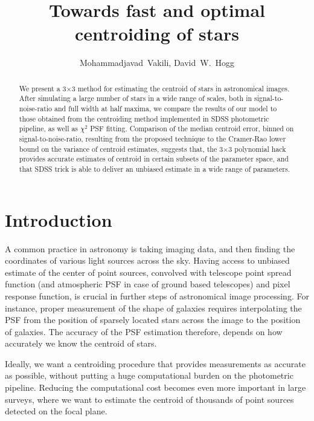 \documentclass[12pt, preprint]{aastex}
\begin{document}
\author{
  Mohammadjavad~Vakili,
  David~W.~Hogg
}

\title{Towards fast and optimal centroiding of stars}

\begin{abstract}

We present a 3$\times$3 method for estimating the centroid of stars in astronomical images. After simulating a large number of stars in a wide range of scales, both in signal-to-noise-ratio and full width at half maxima, we compare the results of our model to those obtained from the centroiding method implemented in
SDSS photometric pipeline, as well as $\chi^{2}$ PSF fitting. Comparison of the median centroid error, binned on signal-to-noise-ratio, resulting from the proposed technique to the Cramer-Rao lower bound on the variance of centroid estimates, suggests that, the 3$\times$3 polynomial hack provides accurate estimates of centroid in certain subsets of the parameter space, and that SDSS trick is able to deliver an unbiased estimate in a wide range of parameters.  

\end{abstract}

\section{Introduction}

A common practice in astronomy is taking imaging data, and then finding the coordinates of various light sources across the sky. Having access to unbiased estimate of the center of point sources, convolved with telescope point spread function (and atmospheric PSF in case of ground based telescopes) and pixel response function, is crucial in further steps of astronomical image processing. For instance, proper measurement of the shape of galaxies requires interpolating the PSF from the position of sparsely located stars across the image to the position of galaxies. The accuracy of the PSF estimation therefore, depends on how accurately we know the centroid of stars.

Ideally, we want a centroiding procedure that provides measurements as accurate as possible, without putting a huge computational burden on the photometric pipeline. Reducing the computational cost becomes even more important in large surveys, where we want to estimate the centroid of thousands of point sources detected on the focal plane. 
\end{document}
